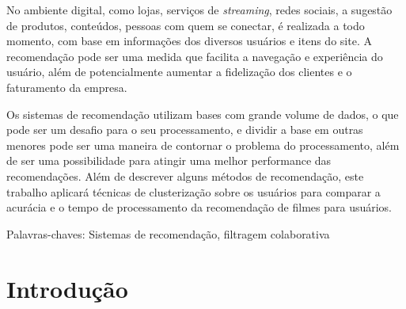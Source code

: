 \documentclass[12pt,a4paper,header]{abnt}
\begin{document}
\begin{resumo}

No ambiente digital, como lojas, serviços de \textit{streaming}, redes sociais, a sugestão de produtos, conteúdos, pessoas com quem se conectar, é realizada a todo momento, com base em informações dos diversos usuários e itens do site. A recomendação pode ser uma medida que facilita a navegação e experiência do usuário, além de potencialmente aumentar a fidelização dos clientes e o faturamento da empresa.

Os sistemas de recomendação utilizam bases com grande volume de dados, o que pode ser um desafio para o seu processamento, e dividir a base em outras menores pode ser uma maneira de contornar o problema do processamento, além de ser uma possibilidade para atingir uma melhor performance das recomendações. Além de descrever alguns métodos de recomendação, este trabalho aplicará técnicas de clusterização sobre os usuários para comparar a acurácia e o tempo de processamento da recomendação de filmes para usuários.

\vspace{1cm}
\noindent Palavras-chaves:
Sistemas de recomendação, filtragem colaborativa


\end{resumo}

% 
% 
% 
% 


\tableofcontents{}
\listoffigures
\listoftables



\chapter{Introdução} \label{cap:introducao}
\end{document}
